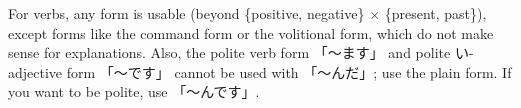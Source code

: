 \documentclass[../nihongo-gakushuu-kyouzai.tex]{subfiles}
\begin{document}

For verbs, any form is usable (beyond \{positive, negative\} $\times$ \{present, past\}), except forms like the command form or the volitional form, which do not make sense for explanations. Also, the polite verb form 「〜ます」 and polite い-adjective form 「〜です」 cannot be used with 「〜んだ」; use the plain form. If you want to be polite, use 「〜んです」.
\end{document}
